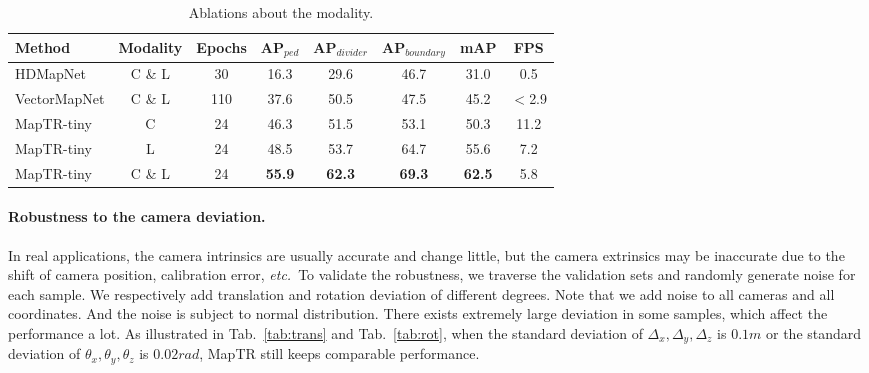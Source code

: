 \documentclass{article} \usepackage{iclr2023_conference,times}
\def\etc{\emph{etc.}}
\begin{document}
\begin{table}[ht!]
\begin{center}

\begin{tabular}{lcc|cccc|c}
\hline
\rowcolor{Gray}
Method & Modality & Epochs & AP$_{\textit{ped}}$ & AP$_{\textit{divider}}$ & AP$_{\textit{boundary}}$ & mAP & FPS \\
\toprule
HDMapNet & C \& L & 30 & 16.3 & 29.6 & 46.7 & 31.0 & 0.5\\
VectorMapNet & C \& L  & 110 & 37.6 & 50.5 & 47.5 & 45.2 & $<$2.9\\
\midrule
MapTR-tiny & C & 24 & \cellcolor{blue!10}46.3 & \cellcolor{blue!10}51.5 & \cellcolor{blue!10}53.1 & \cellcolor{blue!10}50.3& \cellcolor{blue!10}11.2\\
MapTR-tiny & L  &24 & 48.5 & 53.7  & 64.7 &55.6 &7.2\\
MapTR-tiny & C \& L  &24 & \textbf{55.9} & \textbf{62.3}  & \textbf{69.3} & \textbf{62.5} &5.8\\
\bottomrule
\end{tabular}

\end{center}
\vspace*{-0.45cm}
\caption{Ablations about the modality.}
\label{tab:modality}
\vspace*{-0.35cm}
\end{table}

\paragraph{Robustness to the camera deviation.} In real applications, the camera intrinsics are usually accurate and change little, but the camera extrinsics may be inaccurate due to the shift of camera position, calibration error, \etc~To validate the robustness, we traverse the validation sets and randomly generate noise for each sample. We respectively add translation and rotation deviation of different degrees.
Note that we add noise to all cameras and all coordinates. 
And the noise is subject to normal distribution. There exists extremely large deviation in some samples, which affect the performance a lot. As illustrated in Tab.~\ref{tab:trans} and Tab.~\ref{tab:rot}, when the standard deviation of  $\Delta_x, \Delta_y, \Delta_z$ is  $0.1m$ or the standard deviation of $\theta_x, \theta_y, \theta_z$ is  $0.02rad$, MapTR still keeps comparable performance.
\end{document}
